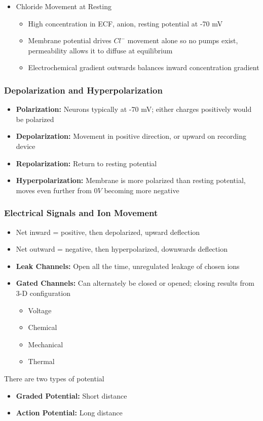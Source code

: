 \documentclass[11pt]{article}
\begin{document}
\begin{itemize}
\item Chloride Movement at Resting
\begin{itemize}
\item High concentration in ECF, anion, resting potential at -70 mV
\item Membrane potential drives $Cl^-$ movement alone so no pumps exist, permeability allows it to diffuse at equilibrium
\item Electrochemical gradient outwards balances inward concentration gradient
\end{itemize}
\end{itemize}

\subsubsection{Depolarization and Hyperpolarization}
\begin{itemize}
\item \textbf{Polarization: }Neurons typically at -70 mV; either charges positively would be polarized
\item \textbf{Depolarization: }Movement in positive direction, or upward on recording device
\item \textbf{Repolarization:} Return to resting potential
\item \textbf{Hyperpolarization:} Membrane is more polarized than resting potential, moves even further from $0V$ becoming more negative
\end{itemize}

\subsubsection{Electrical Signals and Ion Movement}
\begin{itemize}
\item Net inward = positive, then depolarized, upward deflection
\item Net outward = negative, then hyperpolarized, downwards deflection
\item \textbf{Leak Channels:} Open all the time, unregulated leakage of chosen ions
\item \textbf{Gated Channels:} Can alternately be closed or opened; closing results from 3-D configuration
\begin{itemize}
\item Voltage
\item Chemical
\item Mechanical
\item Thermal
\end{itemize}
\end{itemize}
There are two types of potential
\begin{itemize}
\item \textbf{Graded Potential:} Short distance
\item \textbf{Action Potential:} Long distance
\end{itemize}
\end{document}
